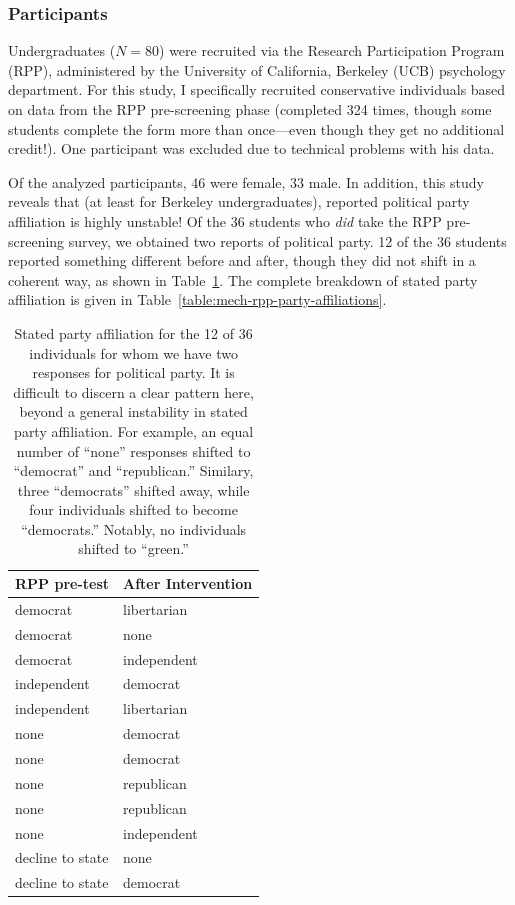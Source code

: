 \subsubsection{Participants}

Undergraduates ($N=80$) were recruited via the Research Participation Program
(RPP), administered by the University of California, Berkeley (UCB) psychology
department. For this study, I specifically recruited conservative individuals
based on data from the RPP pre-screening phase (completed 324 times, though some
students complete the form more than once---even though they get no additional
credit!). One participant was excluded due to technical problems with his data.

Of the analyzed participants, 46 were female, 33 male. In addition, this study
reveals that (at least for Berkeley undergraduates), reported political party
affiliation is highly unstable! Of the 36 students who \emph{did} take the RPP
pre-screening survey, we obtained two reports of political party. 12 of the 36
students reported something different before and after, though they did not
shift in a coherent way, as shown in Table~\ref{table:mech-rpp-party-shifts}.
The complete breakdown of stated party affiliation is given in
Table~\ref{table:mech-rpp-party-affiliations}.

\begin{table}[ht]
\centering
\caption{Stated party affiliation for the 12 of 36 individuals for whom we have
    two responses for political party. It is difficult to discern a clear
    pattern here, beyond a general instability in stated party affiliation. For
    example, an equal number of “none” responses shifted to “democrat” and
    “republican.” Similary, three “democrats” shifted away, while four
    individuals shifted to become “democrats.” Notably, no individuals shifted
    to “green.”}
\label{table:mech-rpp-party-shifts}
\begin{tabular}{ll}
  \toprule
 RPP pre-test & After Intervention \\ 
  \midrule
   democrat & libertarian \\ 
   democrat & none \\ 
   democrat & independent \\ 
   independent & democrat \\ 
   independent & libertarian \\ 
   none & democrat \\ 
   none & democrat \\ 
   none & republican \\ 
   none & republican \\ 
   none & independent \\ 
   decline to state & none \\ 
   decline to state & democrat \\ 
   \bottomrule
\end{tabular}
\end{table}

